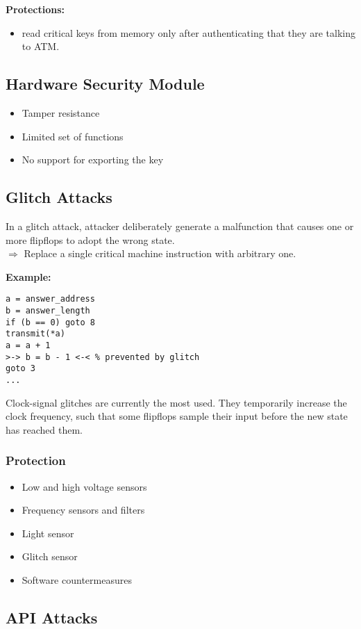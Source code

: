 \textbf{Protections:}
\begin{itemize}
  \item read critical keys from memory only after authenticating
    that they are talking to ATM.
\end{itemize}

\subsection{Hardware Security Module}
\begin{itemize}
  \item Tamper resistance
  \item Limited set of functions
  \item No support for exporting the key
\end{itemize}

\subsection{Glitch Attacks}
In a glitch attack, attacker deliberately generate a malfunction that
causes one or more flipflops to adopt the wrong state.\\
$\Rightarrow$ Replace a single critical machine instruction with arbitrary one.

\textbf{Example:}
\begin{lstlisting}
a = answer_address
b = answer_length
if (b == 0) goto 8
transmit(*a)
a = a + 1
>-> b = b - 1 <-< % prevented by glitch
goto 3
...
\end{lstlisting}
Clock-signal glitches are currently the most used. They temporarily increase
the clock frequency, such that some flipflops sample their input before the new
state has reached them.

\subsubsection{Protection}
\begin{itemize}
  \item  Low and high voltage sensors
  \item Frequency sensors and filters
  \item Light sensor
  \item Glitch sensor
  \item Software countermeasures
\end{itemize}

\subsection{API Attacks}
